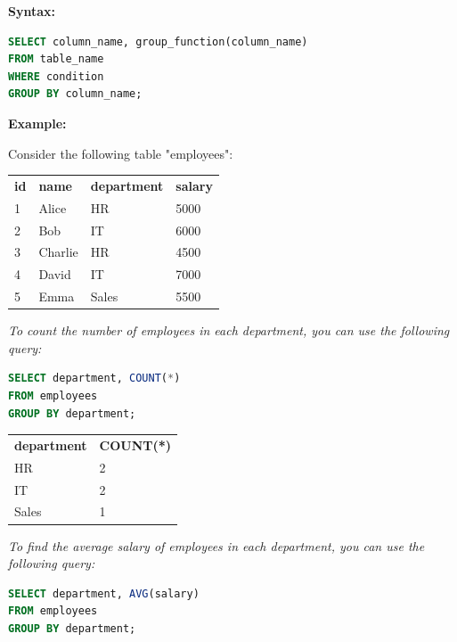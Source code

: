 \documentclass[11pt]{article}
\begin{document}
\textbf{Syntax: }

\begin{lstlisting}[language=sql]
SELECT column_name, group_function(column_name)
FROM table_name
WHERE condition
GROUP BY column_name;
\end{lstlisting}

\textbf{Example: }

Consider the following table "employees":

\begin{table}[H]
	\begin{tabular}{llll}
		\textbf{id} & \textbf{name} & \textbf{department} & \textbf{salary} \\
		1           & Alice         & HR                  & 5000            \\
		2           & Bob           & IT                  & 6000            \\
		3           & Charlie       & HR                  & 4500            \\
		4           & David         & IT                  & 7000            \\
		5           & Emma          & Sales               & 5500
	\end{tabular}
\end{table}

\textit{To count the number of employees in each department, you can use the following query:}

\begin{lstlisting}[language=sql]
SELECT department, COUNT(*)
FROM employees
GROUP BY department;
\end{lstlisting}


\begin{table}[H]
	\begin{tabular}{ll}
		\textbf{department} & \textbf{COUNT(*)} \\
		HR                  & 2                 \\
		IT                  & 2                 \\
		Sales               & 1
	\end{tabular}
\end{table}


\textit{To find the average salary of employees in each department, you can use the following query:}

\begin{lstlisting}[language=sql]
SELECT department, AVG(salary)
FROM employees
GROUP BY department;
\end{lstlisting}
\end{document}
